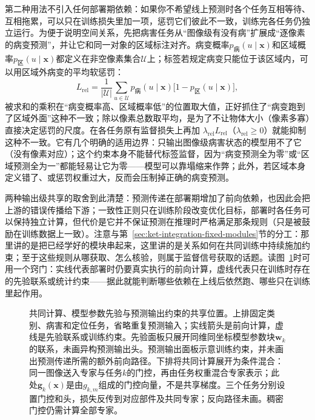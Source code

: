 第二种用法不引入任何部署期依赖：如果你不希望线上预测时各个任务互相等待、互相拖累，可以只在训练损失里加一项，惩罚它们彼此不一致，训练完各任务仍独立运行。为便于说明空间关系，先把病害任务从“图像级有没有病”扩展成“逐像素的病变预测”，并让它和同一对象的区域标注对齐。病变概率$p_{\text{病}}(u\mid\bm x)$和区域概率$p_{\text{区}}(u\mid\bm x)$都定义在非空像素集合$\mathcal U$上；标签若规定病变只能位于该区域内，可以用区域外病变的平均软惩罚：
\begin{equation}
  L_{\mathrm{rel}}
  =\frac{1}{|\mathcal U|}
    \sum_{u\in\mathcal U}
    p_{\text{病}}(u\mid\bm x)
    \bigl[1-p_{\text{区}}(u\mid\bm x)\bigr],
  \label{eq:ket-sharing-output-constraint}
\end{equation}
被求和的乘积在“病变概率高、区域概率低”的位置取大值，正好抓住了“病变跑到了区域外面”这种不一致；除以像素总数取平均，是为了不让物体大小（像素多寡）直接决定惩罚的尺度。在各任务原有监督损失上再加 $\lambda_{\mathrm{rel}}L_{\mathrm{rel}}$（$\lambda_{\mathrm{rel}}\geq0$）就能抑制这种不一致。它有几个明确的适用边界：只输出图像级病害状态的模型用不了它（没有像素对应）；这个约束本身不能替代标签监督，因为“病变预测全为零”或“区域预测全为一”都能轻易让它为零——模型可以靠塌缩来作弊；此外，若区域本身定义错了、或惩罚权重过大，反而会压制掉正确的病变预测。

两种输出级共享的取舍到此清楚：预测传递在部署期增加了前向依赖，也因此会把上游的错误传播给下游；一致性正则只在训练阶段改变优化目标，部署时各任务可以保持独立计算，但代价是它并不保证预测在推理时严格满足那条规则（只是被鼓励在训练数据上一致）。注意与第~\ref{sec:ket-integration-fixed-modules}节的分工：那里讲的是把已经学好的模块串起来，这里讲的是关系如何在共同训练中持续施加约束；至于这些规则从哪获取、怎么核验，则属于监督信号获取的话题。读图~\ref{fig:ket-sharing-locations}时可用一个窍门：实线代表部署时仍要真实执行的前向计算，虚线代表只在训练时存在的先验联系或统计约束——据此就能判断哪些依赖在上线后依然跑、哪些只在训练里起作用。

\begin{figure}[htbp]
  \centering
  
  \caption{共同计算、模型参数先验与预测输出约束的共享位置。上排固定类别、病害和定位任务，省略重复预测输入；实线箭头是前向计算，虚线是先验联系或训练约束。先验面板只展开同维同坐标模型参数块$\bm w_k$的联系，未画异构预测输出头。预测输出面板示意训练约束，并未画出预测传递所需的额外前向路径。下排将共同计算展开为条件混合：同一图像送入专家与任务$k$的门控，再由任务权重混合专家表示；此处$\bm g_k(\bm x)$是由$g_{k,m}$组成的门控向量，不是共享梯度。三个任务分别设置门控和头，损失反传到对应部件及共同专家；反向路径未画。稠密门控仍需计算全部专家。}
  \label{fig:ket-sharing-locations}
\end{figure}
\FloatBarrier

